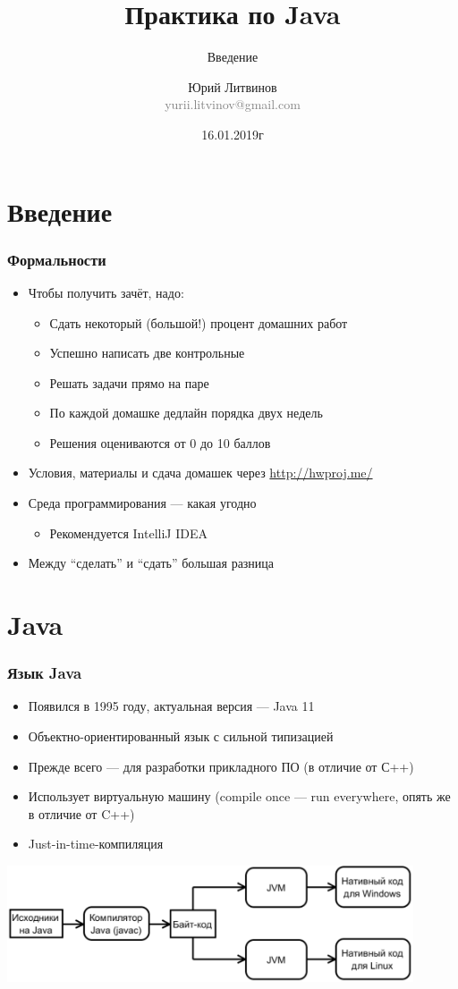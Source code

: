 \documentclass[xetex,mathserif,serif]{beamer}
\title{Практика по Java}
\subtitle{Введение}
\author[Юрий Литвинов]{Юрий Литвинов\\\small{\textcolor{gray}{yurii.litvinov@gmail.com}}}
\date{16.01.2019г}
\begin{document}
	\frame{\titlepage}

	\section{Введение}

	\begin{frame}
		\frametitle{Формальности}
		\begin{itemize}
			\item Чтобы получить зачёт, надо:
			\begin{itemize}
				\item Сдать некоторый (большой!) процент домашних работ
				\item Успешно написать две контрольные
				\item Решать задачи прямо на паре
				\item По каждой домашке дедлайн порядка двух недель
				\item Решения оцениваются от 0 до 10 баллов
			\end{itemize}
			\item Условия, материалы и сдача домашек через \url{http://hwproj.me/}
			\item Среда программирования --- какая угодно
			\begin{itemize}
				\item Рекомендуется IntelliJ IDEA
			\end{itemize}
			\item Между ``сделать'' и ``сдать'' большая разница
		\end{itemize}
	\end{frame}

	\section{Java}

	\begin{frame}
		\frametitle{Язык Java}
		\begin{itemize}
			\item Появился в 1995 году, актуальная версия --- Java 11
			\item Объектно-ориентированный язык с сильной типизацией
			\item Прежде всего --- для разработки прикладного ПО (в отличие от С++)
			\item Использует виртуальную машину (compile once --- run everywhere, опять же в отличие от C++)
			\item Just-in-time-компиляция
		\end{itemize}
		\begin{center}
			\includegraphics[width=0.9\textwidth]{javaCompiling.png}
		\end{center}
	\end{frame}
\end{document}

